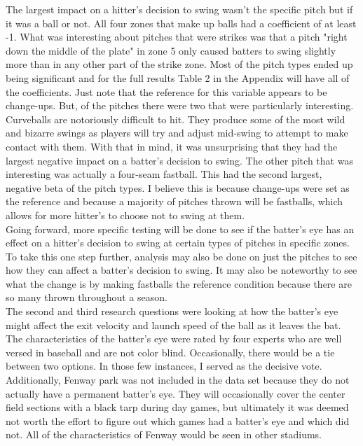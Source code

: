 \documentclass{article}
\begin{document}
\begin{doublespace}
The largest impact on a hitter's decision to swing wasn't the specific pitch but if it was a ball or not. All four zones that make up balls had a coefficient of at least -1. What was interesting about pitches that were strikes was that a pitch "right down the middle of the plate" in zone 5 only caused batters to swing slightly more than in any other part of the strike zone. Most of the pitch types ended up being significant and for the full results Table 2 in the Appendix will have all of the coefficients. Just note that the reference for this variable appears to be change-ups. But, of the pitches there were two that were particularly interesting. Curveballs are notoriously difficult to hit. They produce some of the most wild and bizarre swings as players will try and adjust mid-swing to attempt to make contact with them. With that in mind, it was unsurprising that they had the largest negative impact on a batter's decision to swing. The other pitch that was interesting was actually a four-seam fastball. This had the second largest, negative beta of the pitch types. I believe this is because change-ups were set as the reference and because a majority of pitches thrown will be fastballs, which allows for more hitter's to choose not to swing at them. \\

Going forward, more specific testing will be done to see if the batter's eye has an effect on a hitter's decision to swing at certain types of pitches in specific zones. To take this one step further, analysis may also be done on just the pitches to see how they can affect a batter's decision to swing. It may also be noteworthy to see what the change is by making fastballs the reference condition because there are so many thrown throughout a season. \\

The second and third research questions were looking at how the batter's eye might affect the exit velocity and launch speed of the ball as it leaves the bat. The characteristics of the batter's eye were rated by four experts who are well versed in baseball and are not color blind. Occasionally, there would be a tie between two options. In those few instances, I served as the decisive vote. Additionally, Fenway park was not included in the data set because they do not actually have a permanent batter's eye. They will occasionally cover the center field sections with a black tarp during day games, but ultimately it was deemed not worth the effort to figure out which games had a batter's eye and which did not. All of the characteristics of Fenway would be seen in other stadiums. \\


\end{doublespace}
\end{document}
